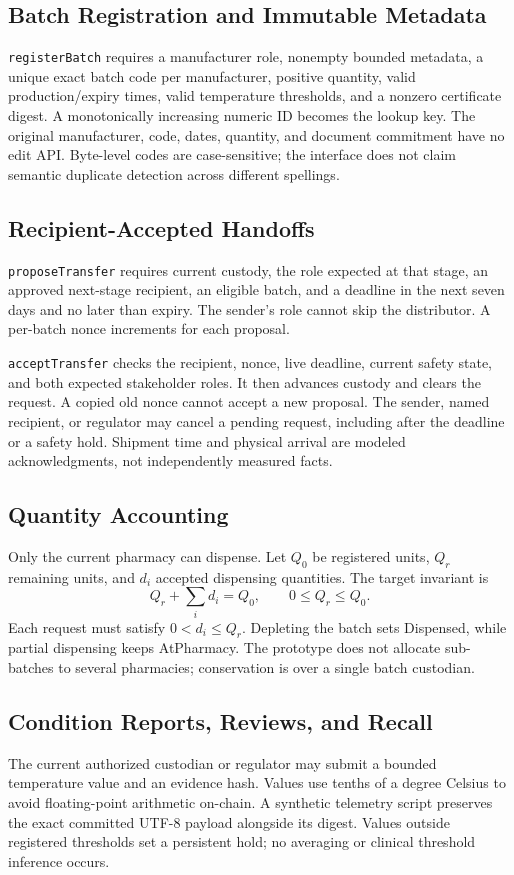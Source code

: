 \subsection{Batch Registration and Immutable Metadata}
\texttt{registerBatch} requires a manufacturer role, nonempty bounded metadata, a unique exact batch code per manufacturer, positive quantity, valid production/expiry times, valid temperature thresholds, and a nonzero certificate digest. A monotonically increasing numeric ID becomes the lookup key. The original manufacturer, code, dates, quantity, and document commitment have no edit API. Byte-level codes are case-sensitive; the interface does not claim semantic duplicate detection across different spellings.

\subsection{Recipient-Accepted Handoffs}
\texttt{proposeTransfer} requires current custody, the role expected at that stage, an approved next-stage recipient, an eligible batch, and a deadline in the next seven days and no later than expiry. The sender's role cannot skip the distributor. A per-batch nonce increments for each proposal.

\texttt{acceptTransfer} checks the recipient, nonce, live deadline, current safety state, and both expected stakeholder roles. It then advances custody and clears the request. A copied old nonce cannot accept a new proposal. The sender, named recipient, or regulator may cancel a pending request, including after the deadline or a safety hold. Shipment time and physical arrival are modeled acknowledgments, not independently measured facts.

\subsection{Quantity Accounting}
Only the current pharmacy can dispense. Let $Q_0$ be registered units, $Q_r$ remaining units, and $d_i$ accepted dispensing quantities. The target invariant is
\begin{equation} Q_r + \sum_i d_i = Q_0,\qquad 0\leq Q_r\leq Q_0.\end{equation}
Each request must satisfy $0<d_i\leq Q_r$. Depleting the batch sets Dispensed, while partial dispensing keeps AtPharmacy. The prototype does not allocate sub-batches to several pharmacies; conservation is over a single batch custodian.

\subsection{Condition Reports, Reviews, and Recall}
The current authorized custodian or regulator may submit a bounded temperature value and an evidence hash. Values use tenths of a degree Celsius to avoid floating-point arithmetic on-chain. A synthetic telemetry script preserves the exact committed UTF-8 payload alongside its digest. Values outside registered thresholds set a persistent hold; no averaging or clinical threshold inference occurs.

